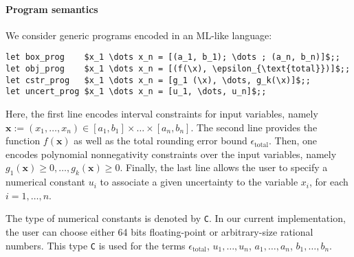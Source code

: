 \documentclass[preprint]{sigplanconf}
\newcommand{\code}[1]{\lstinline{#1}}
\newcommand{\x}{\mathbf{x}}
\theoremstyle{plain}
\begin{document}
\paragraph{Program semantics}
%
We consider generic programs encoded in an ML-like language:
\begin{lstlisting}
let box_prog    $x_1 \dots x_n = [(a_1, b_1); \dots ; (a_n, b_n)]$;;
let obj_prog    $x_1 \dots x_n = [(f(\x), \epsilon_{\text{total}})]$;;
let cstr_prog   $x_1 \dots x_n = [g_1 (\x), \dots, g_k(\x)]$;;
let uncert_prog $x_1 \dots x_n = [u_1, \dots, u_n]$;;
\end{lstlisting}
Here, the first line encodes interval constraints for input variables, namely $\x := (x_1, \dots, x_n) \in [a_1, b_1]\times \dots \times [a_n, b_n]$.
The second line provides the function $f(\x)$ as well as the total rounding error bound $\epsilon_{\text{total}}$.
Then, one encodes polynomial nonnegativity constraints over the input variables, namely $g_1(\x) \geq 0, \dots, g_k(\x) \geq 0$. Finally, the last line allows the user to specify a numerical constant $u_i$ to associate a given uncertainty to the variable $x_i$, for each $i= 1, \dots, n$.

The type of numerical constants is denoted by \code{C}. In our current implementation, the user can choose either 64 bits floating-point or arbitrary-size rational numbers. This type \code{C} is used for the terms $\epsilon_{\text{total}}$, $u_1, \dots, u_n$, $a_1, \dots, a_n$, $b_1, \dots, b_n$.
\end{document}
